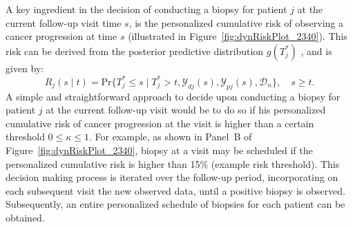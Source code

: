 A key ingredient in the decision of conducting a biopsy for patient $j$ at the current follow-up visit time $s$, is the personalized cumulative risk of observing a cancer progression at time $s$ (illustrated in Figure~\ref{fig:dynRiskPlot_2340}). This risk can be derived from the posterior predictive distribution $g(T^*_j)$ \cite{rizopoulos2011dynamic}, and is given by:
\begin{equation}
\label{eq:dynamic_risk_prob}
R_j(s \mid t) = \mbox{Pr}\big\{T^*_j \leq s \mid T^*_j > t, \mathcal{Y}_{dj}(s), \mathcal{Y}_{pj}(s), \mathcal{D}_n\big\}, \quad s \geq t.
\end{equation}
A simple and straightforward approach to decide upon conducting a biopsy for patient $j$ at the current follow-up visit would be to do so if his personalized cumulative risk of cancer progression at the visit is higher than a certain threshold $0 \leq \kappa \leq 1$. For example, as shown in Panel~B of Figure~\ref{fig:dynRiskPlot_2340}, biopsy at a visit may be scheduled if the personalized cumulative risk is higher than 15\% (example risk threshold). This decision making process is iterated over the follow-up period, incorporating on each subsequent visit the new observed data, until a positive biopsy is observed. Subsequently, an entire personalized schedule of biopsies for each patient can be obtained.


